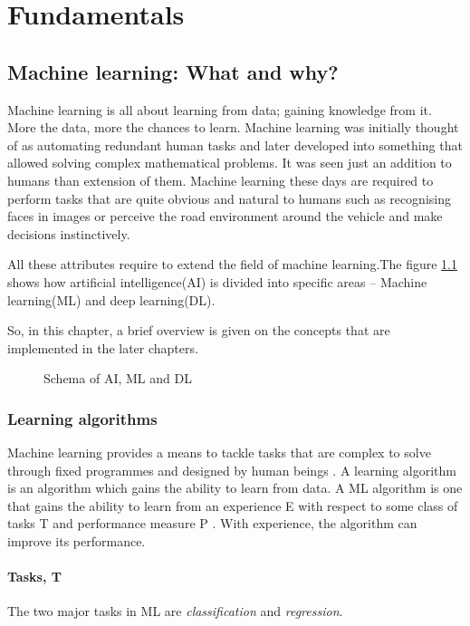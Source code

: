 \chapter{Fundamentals}
\section{Machine learning: What and why?}
Machine learning is all about learning from data; gaining knowledge from it. More the
data, more the chances to learn. Machine learning was initially thought of as automating
redundant human tasks and later developed into something that allowed solving complex
mathematical problems. It was seen just an addition to humans than extension of them.
Machine learning these days are required to perform tasks that are quite obvious and
natural to humans such as recognising faces in images or perceive the road environment
around the vehicle and make decisions instinctively.

All these attributes require to extend the field of machine learning.The figure \ref{fig:ai_ml_dl} shows how artificial
intelligence(AI) is divided into specific areas -- Machine learning(ML) and deep learning(DL).

So, in this chapter, a brief overview is given on the concepts that are implemented in the later chapters.

\begin{figure}[h]
	\centering
    \def\svgwidth{0.5\textwidth}
    \caption{Schema of AI, ML and DL}
    \label{fig:ai_ml_dl}
\end{figure}

\subsection{Learning algorithms}
Machine learning provides a means to tackle tasks that are complex to solve through fixed
programmes and designed by human beings \cite{Goodfellow-et-al-2016}. A learning algorithm
is an algorithm which gains the ability to learn from data. A ML algorithm is one that
gains the ability to learn from an experience E with respect to some class of tasks T and
performance measure P \cite{mitchell1996m}. With experience, the algorithm can improve its
performance.

\subsubsection*{Tasks, T}
The two major tasks in ML are \textit{classification} and \textit{regression}.

